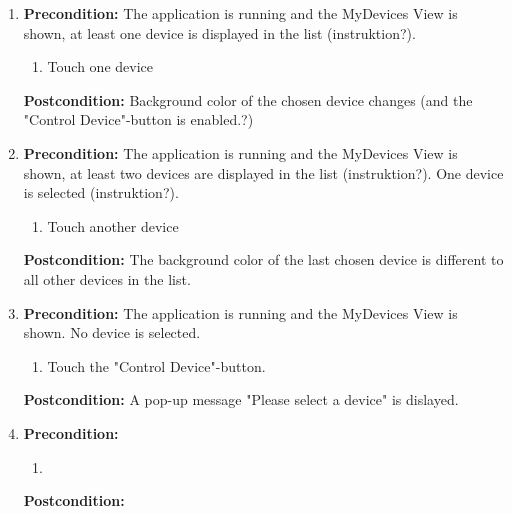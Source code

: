 \documentclass[a4paper]{article}
\newlength{\testlabellength}
\newenvironment{testlist}{\begin{enumerate}[label=\bfseries Instruction \thesubsection.\arabic* , labelindent=0pt, labelwidth=\testlabellength , leftmargin=2cm]}{\end{enumerate}}
\begin{document}
\begin{appendices}
\begin{testlist}
    \item \vspace{5mm} \textbf{Precondition:} The application is running and the MyDevices View is shown, at least one device is displayed in the list (instruktion?).
    			\begin{enumerate}
                	\item Touch one device
                \end{enumerate}
                \textbf{Postcondition:} Background color of the chosen device changes (and the "Control Device"-button is enabled.?)  
   
   \item \vspace{5mm} \textbf{Precondition:} The application is running and the MyDevices View is shown, at least two devices are displayed in the list (instruktion?). One device is selected (instruktion?).
    			\begin{enumerate}
                    \item Touch another device
                \end{enumerate}
                \textbf{Postcondition:} The background color of the last chosen device is different to all other devices in the list.
   
   \item \vspace{5mm} \textbf{Precondition:} The application is running and the MyDevices View is shown. No device is selected.
    			\begin{enumerate}
                    \item Touch the "Control Device"-button.
                \end{enumerate}
                \textbf{Postcondition:} A pop-up message "Please select a device" is dislayed.
   
   \item \vspace{5mm} \textbf{Precondition:} 
    			\begin{enumerate}
                    \item 
                \end{enumerate}
                \textbf{Postcondition:} 
   

\end{testlist}
\end{appendices}
\end{document}
